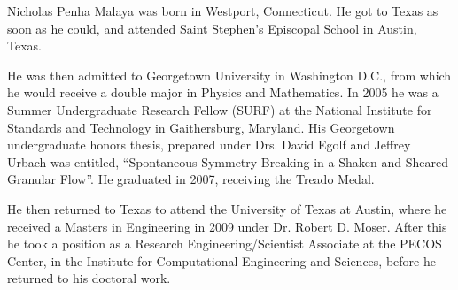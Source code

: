 

Nicholas Penha Malaya was born in Westport, Connecticut. He got to Texas
as soon as he could, and attended Saint Stephen's Episcopal School in
Austin, Texas. 

He was then admitted to Georgetown University in Washington D.C., from
which he would receive a double major in Physics and Mathematics. In
2005 he was a Summer Undergraduate Research Fellow (SURF) at the
National Institute for Standards and Technology in Gaithersburg,
Maryland. His Georgetown undergraduate honors thesis, prepared under
Drs\@. David Egolf and Jeffrey Urbach was entitled, ``Spontaneous
Symmetry Breaking in a Shaken and Sheared Granular Flow''. He graduated
in 2007, receiving the Treado Medal.   

He then returned to Texas to attend the University of Texas at
Austin, where he received a Masters in Engineering in 2009 under
Dr\@. Robert D. Moser. After this he took a position as a Research
Engineering/Scientist Associate at the PECOS Center, in the Institute
for Computational Engineering and Sciences, before he returned to his
doctoral work. 

